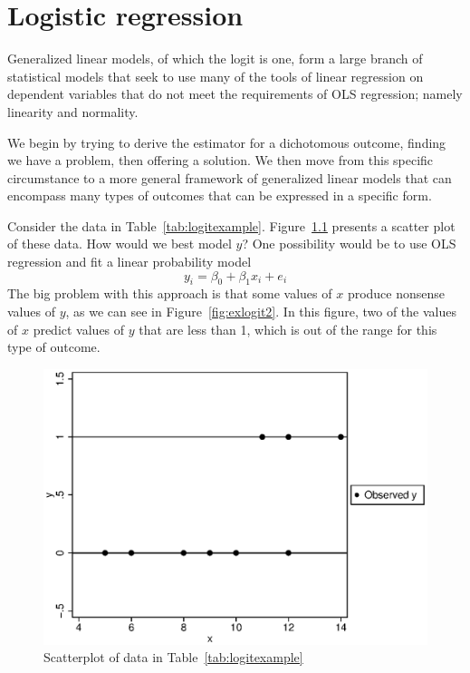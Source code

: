 
\chapter{Logistic regression}
\label{sec:logit}
Generalized linear models, of which the logit is one, form a large branch of statistical models that seek to use many of the tools of linear regression on dependent variables that do not meet the requirements of OLS regression; namely linearity and normality.

We begin by trying to derive the estimator for a dichotomous outcome, finding we have a problem, then offering a solution. We then move from this specific circumstance to a more general framework of generalized linear models that can encompass many types of outcomes that can be expressed in a specific form.

Consider the data in Table~\ref{tab:logitexample}. Figure~\ref{fig:exlogit1} presents a scatter plot of these data.  How would we best model $y$? One possibility would be to use OLS regression and fit a linear probability model
\[
y_i=\beta_0+\beta_1x_i+e_i
\]
The big problem with this approach is that some values of $x$ produce nonsense values of $y$, as we can see in Figure~\ref{fig:exlogit2}. In this figure, two of the values of $x$ predict values of $y$ that are less than 1, which is out of the range for this type of outcome.

\begin{figure}
   \centering
   \includegraphics[angle=0,
           width=.75\textwidth]{exlogit1.eps}
   \caption{Scatterplot of data in Table~\ref{tab:logitexample}}
  \label{fig:exlogit1}
\end{figure}

